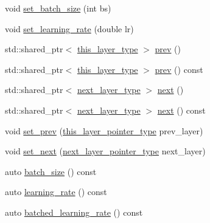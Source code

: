 \begin{DoxyCompactItemize}
void \hyperlink{structbc_1_1nn_1_1Polymorphic__Layer__Base_a4d11290c40096f27144a6ec9fa976b12}{set\+\_\+batch\+\_\+size} (int bs)
\item 
void \hyperlink{structbc_1_1nn_1_1Polymorphic__Layer__Base_a9ca5f068a02a1b132d8a90e2c307b4d9}{set\+\_\+learning\+\_\+rate} (double lr)
\item 
std\+::shared\+\_\+ptr$<$ \hyperlink{structbc_1_1nn_1_1Polymorphic__Layer__Base_a6087076d2e0a31e6bbdc2c2039c3ab52}{this\+\_\+layer\+\_\+type} $>$ \hyperlink{structbc_1_1nn_1_1Polymorphic__Layer__Base_aaecf0bed7f2e610b7b923dbc3d4a81d6}{prev} ()
\item 
std\+::shared\+\_\+ptr$<$ \hyperlink{structbc_1_1nn_1_1Polymorphic__Layer__Base_a6087076d2e0a31e6bbdc2c2039c3ab52}{this\+\_\+layer\+\_\+type} $>$ \hyperlink{structbc_1_1nn_1_1Polymorphic__Layer__Base_a0e55941ac286ccaf77b4c810a8f1cd09}{prev} () const
\item 
std\+::shared\+\_\+ptr$<$ \hyperlink{structbc_1_1nn_1_1Polymorphic__Layer__Base_ac7d70db83e8370d2975d05401713f677}{next\+\_\+layer\+\_\+type} $>$ \hyperlink{structbc_1_1nn_1_1Polymorphic__Layer__Base_afe77ff310be16c9357ea66bec8d6306b}{next} ()
\item 
std\+::shared\+\_\+ptr$<$ \hyperlink{structbc_1_1nn_1_1Polymorphic__Layer__Base_ac7d70db83e8370d2975d05401713f677}{next\+\_\+layer\+\_\+type} $>$ \hyperlink{structbc_1_1nn_1_1Polymorphic__Layer__Base_a042ca1b5f4e9c78fa9953e3f310972a5}{next} () const
\item 
void \hyperlink{structbc_1_1nn_1_1Polymorphic__Layer__Base_a4555d0376d65ee631208b5aa6f67d7f2}{set\+\_\+prev} (\hyperlink{structbc_1_1nn_1_1Polymorphic__Layer__Base_a6240b9012fcc8ed91d8a41f07d7c4bd9}{this\+\_\+layer\+\_\+pointer\+\_\+type} prev\+\_\+layer)
\item 
void \hyperlink{structbc_1_1nn_1_1Polymorphic__Layer__Base_a852126e97fd34bcc24c446615e3df3fa}{set\+\_\+next} (\hyperlink{structbc_1_1nn_1_1Polymorphic__Layer__Base_a6f8d2b06bb46d0ef96d0857df2544731}{next\+\_\+layer\+\_\+pointer\+\_\+type} next\+\_\+layer)
\item 
auto \hyperlink{structbc_1_1nn_1_1Polymorphic__Layer__Base_a107ffea414142eb7be7aa45f0387f966}{batch\+\_\+size} () const
\item 
auto \hyperlink{structbc_1_1nn_1_1Polymorphic__Layer__Base_a1b07bace4eb7d7255881d13358c29d26}{learning\+\_\+rate} () const
\item 
auto \hyperlink{structbc_1_1nn_1_1Polymorphic__Layer__Base_a4a592f412e5a7908293385d2e1f567d5}{batched\+\_\+learning\+\_\+rate} () const

\end{DoxyCompactItemize}

